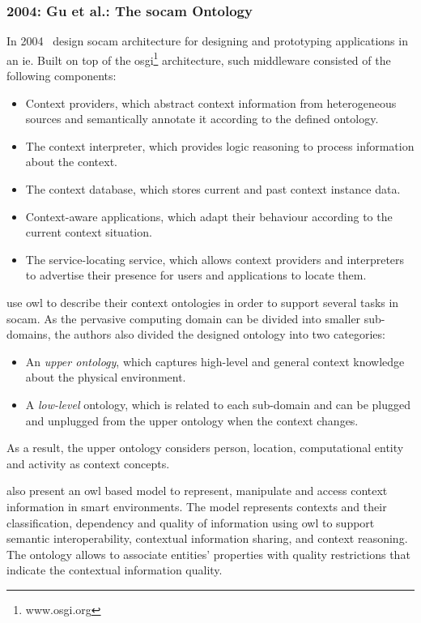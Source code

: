 \subsubsection{2004: Gu et al.: The \ac{socam} Ontology}
\label{sec:gu}

In 2004~\citet{gu_toward_2004} design \ac{socam} architecture for designing and 
prototyping applications in an \ac{ie}. Built on top of the 
\ac{osgi}\footnote{www.osgi.org} architecture, such middleware consisted of the 
following components:

\begin{itemize}
  \item Context providers, which abstract context information from heterogeneous
  sources and semantically annotate it according to the defined ontology.
  \item The context interpreter, which provides logic reasoning to process
  information about the context.
  \item The context database, which stores current and past context instance data.
  \item Context-aware applications, which adapt their behaviour according to the
  current context situation.
  \item The service-locating service, which allows context providers and 
  interpreters to advertise their presence for users and applications to locate 
  them.
\end{itemize}

\citeauthor{gu_toward_2004} use \ac{owl} to describe their context ontologies 
in order to support several tasks in \ac{socam}. As the pervasive computing 
domain can be divided into smaller sub-domains, the authors also divided the 
designed ontology into two categories: 

\begin{itemize}
  \item An \textit{upper ontology}, which captures high-level and general 
  context knowledge about the physical environment.
  \item A \textit{low-level} ontology, which is related to each sub-domain and 
  can be plugged and unplugged from the upper ontology when the context changes.
\end{itemize}

As a result, the upper ontology considers person, location, computational entity
and activity as context concepts.

\citet{gu_ontology_based_2004} also present an \ac{owl} based model to represent, 
manipulate and access context information in smart environments. The model 
represents contexts and their classification, dependency and quality of
information using \ac{owl} to support semantic interoperability, contextual 
information sharing, and context reasoning. The ontology allows to associate 
entities' properties with quality restrictions that indicate the contextual 
information quality. 